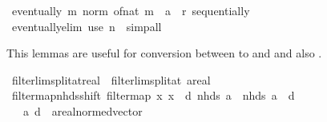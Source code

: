 \begin{isabellebody}
\ {\isachardoublequoteopen}eventually\ {\isacharparenleft}{\kern0pt}{\isasymlambda}m{\isachardot}{\kern0pt}\ norm\ {\isacharparenleft}{\kern0pt}of{\isacharunderscore}{\kern0pt}nat\ m\ {\isacharcolon}{\kern0pt}{\isacharcolon}{\kern0pt}\ {\isacharprime}{\kern0pt}a{\isacharparenright}{\kern0pt}\ {\isasymge}\ r{\isacharparenright}{\kern0pt}\ sequentially{\isachardoublequoteclose}\isanewline
\ \ \ \ \isamarkupfalse%
\ eventually{\isacharunderscore}{\kern0pt}elim\ {\isacharparenleft}{\kern0pt}use\ n\ \ simp{\isacharunderscore}{\kern0pt}all{\isacharparenright}{\kern0pt}\isanewline
{}\isamarkupfalse%
%
\endisatagproof
{\isafoldproof}%
%
\isadelimproof
%
\endisadelimproof
%
\isadelimdocument
%
\endisadelimdocument
%
\isatagdocument
%
\isamarkuptrue%
%
\endisatagdocument
{\isafolddocument}%
%
\isadelimdocument
%
\endisadelimdocument
%
\begin{isamarkuptext}%
This lemmas are useful for conversion between  to  and
   and also .%
\end{isamarkuptext}\isamarkuptrue%
\isamarkupfalse%
\ filterlim{\isacharunderscore}{\kern0pt}split{\isacharunderscore}{\kern0pt}at{\isacharunderscore}{\kern0pt}real\ {\isacharequal}{\kern0pt}\ filterlim{\isacharunderscore}{\kern0pt}split{\isacharunderscore}{\kern0pt}at{\isacharbrackleft}{\kern0pt}\ {\isacharprime}{\kern0pt}a{\isacharequal}{\kern0pt}real{\isacharbrackright}{\kern0pt}\isanewline
\isanewline
{}\isamarkupfalse%
\ filtermap{\isacharunderscore}{\kern0pt}nhds{\isacharunderscore}{\kern0pt}shift{\isacharcolon}{\kern0pt}\ {\isachardoublequoteopen}filtermap\ {\isacharparenleft}{\kern0pt}{\isasymlambda}x{\isachardot}{\kern0pt}\ x\ {\isacharminus}{\kern0pt}\ d{\isacharparenright}{\kern0pt}\ {\isacharparenleft}{\kern0pt}nhds\ a{\isacharparenright}{\kern0pt}\ {\isacharequal}{\kern0pt}\ nhds\ {\isacharparenleft}{\kern0pt}a\ {\isacharminus}{\kern0pt}\ d{\isacharparenright}{\kern0pt}{\isachardoublequoteclose}\isanewline
\ \ \ a\ d\ {\isacharcolon}{\kern0pt}{\isacharcolon}{\kern0pt}\ {\isachardoublequoteopen}{\isacharprime}{\kern0pt}a{\isacharcolon}{\kern0pt}{\isacharcolon}{\kern0pt}real{\isacharunderscore}{\kern0pt}normed{\isacharunderscore}{\kern0pt}vector{\isachardoublequoteclose}\isanewline

\end{isabellebody}
